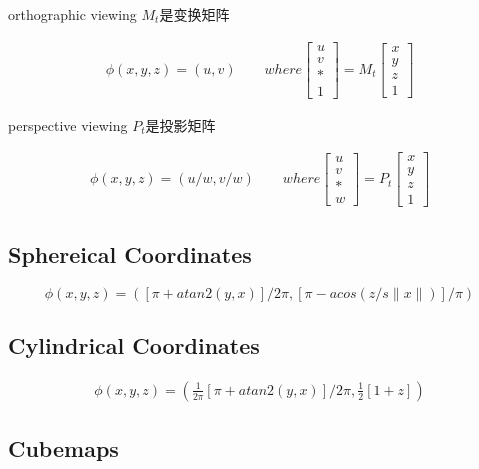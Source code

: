 orthographic viewing $M_{t}$是变换矩阵

\begin{align*}
    \phi(x,y,z) = (u,v) \qquad where 
    \begin{bmatrix} u \\ v \\ * \\ 1 \end{bmatrix} = M_{t} 
    \begin{bmatrix} x \\ y \\ z \\ 1 \end{bmatrix}
\end{align*}

perspective viewing $P_{t}$是投影矩阵

\begin{align*}
    \phi(x,y,z) = (u/w,v/w) \qquad where 
    \begin{bmatrix} u \\ v \\ * \\ w \end{bmatrix} = P_{t} 
    \begin{bmatrix} x \\ y \\ z \\ 1 \end{bmatrix}
\end{align*}


\subsection{Sphereical Coordinates}

\begin{equation}
    \phi(x,y,z) = ([\pi+atan2(y,x)]/2\pi,[\pi-acos(z/s\|x\|)]/\pi)
\end{equation}

\subsection{Cylindrical Coordinates}

\begin{align*}
    \phi(x,y,z) = (\frac{1}{2\pi}[\pi+atan2(y,x)]/2\pi,\frac{1}{2}[1+z])
\end{align*}

\subsection{Cubemaps}

